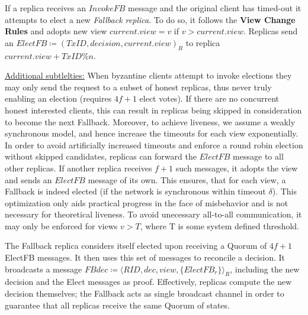 
If a replica receives an $InvokeFB$ message and the original client has timed-out it attempts to elect a new \textit{Fallback replica}. To do so, it follows the \textbf{View Change Rules} and adopts new view $current.view = v$ if $v > current.view$. 
Replicas send an $ElectFB \coloneqq (TxID, decision, current.view)_R$ to replica $current.view + TxID \% n$. 


\underline{Additional subtlelties:} 
When byzantine clients attempt to invoke elections they may only send the request to a subset of honest replicas, thus never truly enabling an election (requires $4f+1$ elect votes). If there are no concurrent honest interested clients, this can result in replicas being skipped in consideration to become the next Fallback. Moreover, to achieve liveness, we assume a weakly synchronous model, and hence increase the timeouts for each view exponentially.
In order to avoid artificially increased timeouts and enforce a round robin election without skipped candidates, replicas can forward the $ElectFB$ message to all other replicas. If another replica receives $f+1$ such messages, it adopts the view and sends an $ElectFB$ message of its own. This ensures, that for each view, a Fallback is indeed elected (if the network is synchronous within timeout $\delta$). This optimization only aids practical progress in the face of misbehavior and is not necessary for theoretical liveness. To avoid unecessary all-to-all communication, it may only be enforced for views $v > T$, where T is some system defined threshold.  



The Fallback replica considers itself elected upon receiving a Quorum of $4f+1$ ElectFB messages. It then uses this set of messages to reconcile a decision. It broadcasts a message $FBdec \coloneqq \langle RID, dec, view, \{ElectFB_r\} \rangle_R$, including the new decision and the Elect messages as proof. Effectively, replicas compute the new decision themselves; the Fallback acts as single broadcast channel in order to guarantee that all replicas receive the same Quorum of states.

